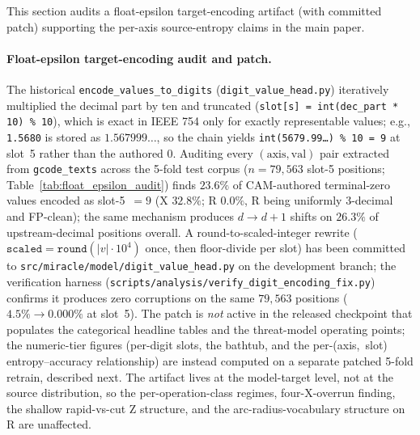 \documentclass[11pt,a4paper]{article}
\begin{document}
This section audits a float-epsilon target-encoding artifact (with committed patch) supporting the per-axis source-entropy claims in the main paper.

\paragraph{Float-epsilon target-encoding audit and patch.} The historical \texttt{encode\_values\_to\_digits} (\texttt{digit\_\allowbreak value\_head.py}) iteratively multiplied the decimal part by ten and truncated (\texttt{slot[s] = int(dec\_part * 10) \% 10}), which is exact in IEEE 754 only for exactly representable values; e.g., \texttt{1.5680} is stored as $1.567999\ldots$, so the chain yields \texttt{int(5679.99\ldots) \% 10 = 9} at slot~5 rather than the authored $0$. Auditing every $(\text{axis},\text{val})$ pair extracted from \texttt{gcode\_texts} across the 5-fold test corpus ($n\!=\!79{,}563$ slot-5 positions; Table~\ref{tab:float_epsilon_audit}) finds $23.6\%$ of CAM-authored terminal-zero values encoded as slot-5~$=9$ (X $32.8\%$; R $0.0\%$, R being uniformly 3-decimal and FP-clean); the same mechanism produces $d\!\to\!d\!+\!1$ shifts on $26.3\%$ of upstream-decimal positions overall. A round-to-scaled-integer rewrite ($\texttt{scaled} = \texttt{round}(\lvert v \rvert \cdot 10^{4})$ once, then floor-divide per slot) has been committed to \texttt{src/\allowbreak miracle/\allowbreak model/\allowbreak digit\_value\_head.py} on the development branch; the verification harness (\texttt{scripts/\allowbreak analysis/\allowbreak verify\_digit\_encoding\_fix.py}) confirms it produces zero corruptions on the same $79{,}563$ positions ($4.5\%\!\to\!0.000\%$ at slot~5). The patch is \emph{not} active in the released checkpoint that populates the categorical headline tables and the threat-model operating points; the numeric-tier figures (per-digit slots, the bathtub, and the per-(axis,~slot) entropy--accuracy relationship) are instead computed on a separate patched 5-fold retrain, described next. The artifact lives at the model-target level, not at the source distribution, so the per-operation-class regimes, four-X-overrun finding, the shallow rapid-vs-cut Z structure, and the arc-radius-vocabulary structure on R are unaffected.
\end{document}
